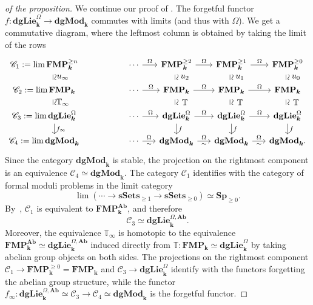\documentclass[11pt]{article}
\let\mathcal\mathscr
\let\autoref\Cref
\theoremstyle{definition}
\newcommand{\T}{\mathbb{T}}
\newcommand{\Cc}{\mathcal{C}}
\newcommand{\sSets}{\mathbf{sSets}}
\newcommand{\Sp}{\mathbf{Sp}}
\newcommand{\dgLie}{\mathbf{dgLie}}
\newcommand{\dgMod}{\mathbf{dgMod}}
\newcommand{\FMP}{\mathbf{FMP}}
\newcommand{\Ab}{\mathbf{Ab}}
\renewcommand{\k}{{\boldsymbol{k}}}
\begin{document}
\begin{proof}[of the proposition]
We continue our proof of \autoref{prop:abelianlie}. The forgetful functor $f \colon \dgLie_\k^{\Omega} \to \dgMod_\k$ commutes with limits (and thus with $\Omega$). We get a commutative diagram, where the leftmost column is obtained by taking the limit of the rows
\[
\begin{tikzcd}[row sep=1.3em, column sep=1.6em]
\Cc_1 := \lim \FMP_\k^{\geq n} \phantom{:= \Cc_1} \ar[phantom, yshift=0.1em]{d}[sloped]{\simeq}[xshift=1em]{ u_\infty} &
\quad \cdots \ar{r}{\Omega} &
\FMP_\k^{\geq 2} \ar{r}{\Omega} \ar[phantom, yshift=0.1em]{d}[sloped]{\simeq}[xshift=1em]{ u_2} & \FMP_\k^{\geq 1} \ar{r}{\Omega} \ar[phantom, yshift=0.1em]{d}[sloped]{\simeq}[xshift=1em]{ u_1} & \FMP_\k^{\geq 0} \ar[phantom, yshift=0.1em]{d}[sloped]{\simeq}[xshift=1em]{ u_0}
\\
\Cc_2 := \lim \FMP_\k \phantom{:= \Cc_2} \ar[phantom]{d}[sloped]{\simeq}[xshift=1em]{ \T_\infty} & \quad \cdots \ar{r}{\Omega} & \FMP_\k \ar{r}{\Omega} \ar[phantom]{d}[sloped]{\simeq}[xshift=1em]{ \T} & \FMP_\k \ar{r}{\Omega} \ar[phantom]{d}[sloped]{\simeq}[xshift=1em]{ \T} & \FMP_\k \ar[phantom]{d}[sloped]{\simeq}[xshift=1em]{ \T}
\\
\Cc_3 := \lim \dgLie^\Omega_\k \phantom{:= \Cc_3} \ar{d}{f_\infty} & \quad \cdots \ar{r}{\Omega} & \dgLie_\k^\Omega \ar{r}{\Omega} \ar{d}{f} & \dgLie_\k^\Omega \ar{r}{\Omega} \ar{d}{f} & \dgLie_\k^\Omega \ar{d}{f}
\\
\Cc_4 := \lim \dgMod_\k \phantom{:= \Cc_4} & \quad \cdots \ar{r}{\Omega}[swap]{\sim} & \dgMod_\k \ar{r}{\Omega}[swap]{\sim} & \dgMod_\k \ar{r}{\Omega}[swap]{\sim} & \dgMod_\k.
\end{tikzcd}
\]
Since the category $\dgMod_\k$ is stable, the projection on the rightmost component is an equivalence $\Cc_4 \simeq \dgMod_\k$.
The category $\Cc_1$ identifies with the category of formal moduli problems in the limit category
\[
\lim (\cdots \to \sSets_{\geq 1} \to \sSets_{\geq 0}) \simeq \Sp_{\geq 0}.
\]
By~\cite[Rem.\,5.2.6.26]{lurie:halg}, $\Cc_1$ is equivalent to $\FMP_\k^\Ab$, and therefore
\[
\Cc_3 \simeq \dgLie_\k^{\Omega,\Ab}.
\]
Moreover, the equivalence $\T_\infty$ is homotopic to the equivalence $\FMP_\k^\Ab \simeq \dgLie_\k^{\Omega,\Ab}$ induced directly from $\T \colon \FMP_\k \simeq \dgLie_\k^\Omega$ by taking abelian group objects on both sides.
The projections on the rightmost component $\Cc_1 \to \FMP_\k^{\geq 0} = \FMP_\k$ and $\Cc_3 \to \dgLie_\k^\Omega$ identify with the functors forgetting the abelian group structure, while the functor $f_\infty \colon \dgLie_\k^{\Omega,\Ab} \simeq \Cc_3 \to \Cc_4 \simeq \dgMod_\k$ is the forgetful functor.


\end{proof}
\end{document}
